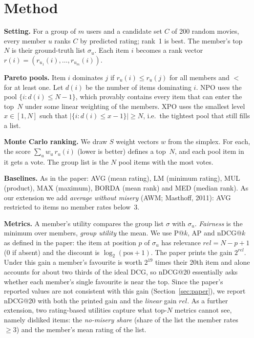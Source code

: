 \documentclass[11pt,a4paper]{article}
\newcommand{\npo}{NPO}
\newcommand{\xpo}{XPO}
\begin{document}
\section{Method}

\textbf{Setting.} For a group of $m$ users and a candidate set $C$ of 200
random movies, every member $u$ ranks $C$ by predicted rating; rank~1 is best.
The member's top~$N$ is their ground-truth list $\sigma_u$. Each item $i$
becomes a rank vector $r(i)=(r_{u_1}(i),\dots,r_{u_m}(i))$.

\textbf{Pareto pools.} Item $i$ dominates $j$ if $r_u(i)\le r_u(j)$ for all
members and $<$ for at least one. Let $d(i)$ be the number of items dominating
$i$. \npo{} uses the pool $\{i: d(i)\le N-1\}$, which provably contains every
item that can enter the top~$N$ under some linear weighting of the members.
\xpo{} uses the smallest level $x\in[1,N]$ such that
$|\{i: d(i)\le x-1\}|\ge N$, i.e.\ the tightest pool that still fills a list.

\textbf{Monte Carlo ranking.} We draw $S$ weight vectors $w$ from the simplex.
For each, the score $\sum_u w_u\,r_u(i)$ (lower is better) defines a top~$N$,
and each pool item in it gets a vote. The group list is the $N$ pool items with
the most votes.

\textbf{Baselines.} As in the paper: AVG (mean rating), LM (minimum rating),
MUL (product), MAX (maximum), BORDA (mean rank) and MED (median rank). As our
extension we add \emph{average without misery} (AWM; Masthoff, 2011): AVG
restricted to items no member rates below~3.

\textbf{Metrics.} A member's utility compares the group list $\sigma$ with
$\sigma_u$. \emph{Fairness} is the minimum over members, \emph{group utility}
the mean. We use P@$k$, AP and nDCG@$k$ as defined in the paper: the item at
position $p$ of $\sigma_u$ has relevance $rel=N-p+1$ (0 if absent) and the
discount is $\log_2(\text{pos}+1)$. The paper prints the gain $2^{rel}$. Under
this gain a member's favourite is worth $2^{19}$ times their 20th item and
alone accounts for about two thirds of the ideal DCG, so nDCG@20 essentially
asks whether each member's single favourite is near the top. Since the paper's
reported values are not consistent with this gain (Section~\ref{sec:paper}),
we report nDCG@20 with both the printed gain and the \emph{linear} gain $rel$.
As a further extension, two rating-based utilities capture what top-$N$
metrics cannot see, namely disliked items: the \emph{no-misery share} (share of
the list the member rates $\ge 3$) and the member's mean rating of the list.
\end{document}
